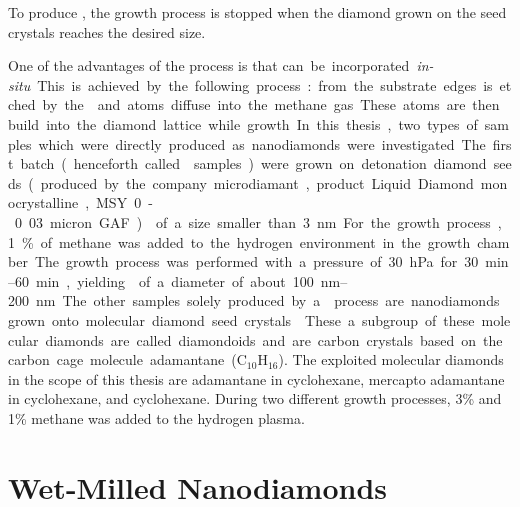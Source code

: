 	To produce \nds, the growth process is stopped when the diamond grown on the seed crystals reaches the desired size. 

	One of the advantages of the \CVD process is that \si can be incorporated \textit{in-situ}.
	This is achieved by the following process: \si from the substrate edges is etched by the  and \si atoms diffuse into the methane gas. 
	These atoms are then build into the diamond lattice while growth.

	In this thesis, two types of samples which were directly produced as nanodiamonds were investigated.
	The first batch (henceforth called \CVD samples) were grown on detonation diamond seeds (produced by the company microdiamant, product Liquid Diamond monocrystalline, MSY 0-0.03 micron GAF) of a size smaller than \SI{3}{nm}.
	For the growth process, 1\% of methane was added to the hydrogen environment in the growth chamber.
	The growth process was performed with a pressure of \SI{30}{hPa} for \SIrange{30}{60}{min}, yielding \nds of a diameter of about \SIrange{100}{200}{nm}.

	The other samples solely produced by a \CVD process are nanodiamonds grown onto molecular diamond seed crystals.
	These a subgroup of these molecular diamonds are called diamondoids and are carbon crystals based on the carbon cage molecule adamantane ($\text{C}_{10}\text{H}_{16}$).
	The exploited molecular diamonds in the scope of this thesis are adamantane in cyclohexane, mercapto adamantane in cyclohexane, and cyclohexane.
	During two different growth processes, 3\% and 1\% methane was added to the hydrogen plasma.




	\section{Wet-Milled Nanodiamonds}
